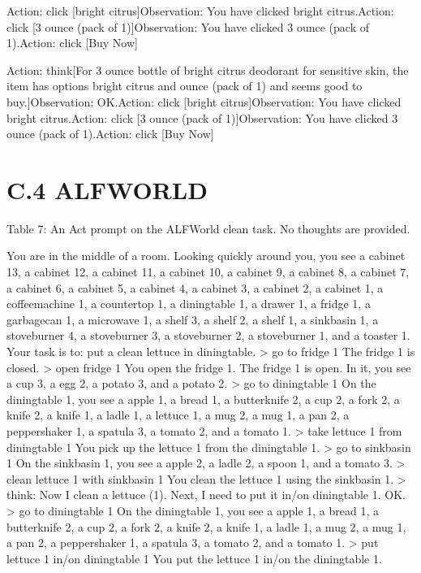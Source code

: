 \documentclass[
]{article}
\newenvironment{Shaded}{}{}
\newcommand{\NormalTok}[1]{#1}
\begin{document}
Action: click {[}bright citrus{]}Observation: You have clicked bright
citrus.Action: click {[}3 ounce (pack of 1){]}Observation: You have
clicked 3 ounce (pack of 1).Action: click {[}Buy Now{]}

Action: think{[}For 3 ounce bottle of bright citrus deodorant for
sensitive skin, the item has options \textquotesingle bright
citrus\textquotesingle{} and  ounce (pack of
1)\textquotesingle{} and seems good to buy.{]}Observation: OK.Action:
click {[}bright citrus{]}Observation: You have clicked bright
citrus.Action: click {[}3 ounce (pack of 1){]}Observation: You have
clicked 3 ounce (pack of 1).Action: click {[}Buy Now{]}

\section{C.4 ALFWORLD}\label{c.4-alfworld}

Table 7: An Act prompt on the ALFWorld clean task. No thoughts are
provided.

\begin{Shaded}
\begin{Highlighting}[]
\NormalTok{You are in the middle of a room. Looking quickly around you, you see a cabinet 13, a cabinet 12, a cabinet 11, a cabinet 10, a cabinet 9, a cabinet 8, a cabinet 7, a cabinet 6, a cabinet 5, a cabinet 4, a cabinet 3, a cabinet 2, a cabinet 1, a coffeemachine 1, a countertop 1, a diningtable 1, a drawer 1, a fridge 1, a garbagecan 1, a microwave 1, a shelf 3, a shelf 2, a shelf 1, a sinkbasin 1, a stoveburner 4, a stoveburner 3, a stoveburner 2, a stoveburner 1, and a toaster 1. Your task is to: put a clean lettuce in diningtable.}
\NormalTok{\textgreater{} go to fridge 1}
\NormalTok{The fridge 1 is closed.}
\NormalTok{\textgreater{} open fridge 1}
\NormalTok{You open the fridge 1. The fridge 1 is open. In it, you see a cup 3, a egg 2, a potato 3, and a potato 2.}
\NormalTok{\textgreater{} go to diningtable 1}
\NormalTok{On the diningtable 1, you see a apple 1, a bread 1, a butterknife 2, a cup 2, a fork 2, a knife 2, a knife 1, a ladle 1, a lettuce 1, a mug 2, a mug 1, a pan 2, a peppershaker 1, a spatula 3, a tomato 2, and a tomato 1.}
\NormalTok{\textgreater{} take lettuce 1 from diningtable 1}
\NormalTok{You pick up the lettuce 1 from the diningtable 1.}
\NormalTok{\textgreater{} go to sinkbasin 1}
\NormalTok{On the sinkbasin 1, you see a apple 2, a ladle 2, a spoon 1, and a tomato 3.}
\NormalTok{\textgreater{} clean lettuce 1 with sinkbasin 1}
\NormalTok{You clean the lettuce 1 using the sinkbasin 1.}
\NormalTok{\textgreater{} think: Now I clean a lettuce (1). Next, I need to put it in/on diningtable 1.}
\NormalTok{OK.}
\NormalTok{\textgreater{} go to diningtable 1}
\NormalTok{On the diningtable 1, you see a apple 1, a bread 1, a butterknife 2, a cup 2, a fork 2, a knife 2, a knife 1, a ladle 1, a mug 2, a mug 1, a pan 2, a peppershaker 1, a spatula 3, a tomato 2, and a tomato 1.}
\NormalTok{\textgreater{} put lettuce 1 in/on diningtable 1}
\NormalTok{You put the lettuce 1 in/on the diningtable 1. }
\end{Highlighting}
\end{Shaded}
\end{document}
